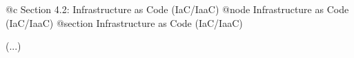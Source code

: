 @c Section 4.2: Infrastructure as Code (IaC/IaaC)
@node Infrastructure as Code (IaC/IaaC)
@section Infrastructure as Code (IaC/IaaC)

(...)
